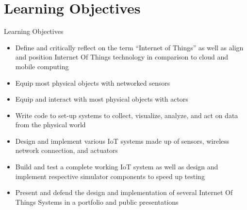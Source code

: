 ﻿\section{Learning Objectives}

\begin{frame}{Learning Objectives}
\begin{itemize}
    \item \alert{Define and critically reflect} on the term “Internet of Things” as well as align and position Internet Of Things technology in comparison to cloud and mobile computing
    \item Equip most \alert{physical objects} with \alert{networked sensors}
    \item Equip and interact with most \alert{physical objects} with \alert{actors}
    \item \alert{Write code} to set-up systems to \alert{collect}, \alert{visualize}, \alert{analyze}, and \alert{act on data from the physical world}
    \item \alert{Design} and \alert{implement various IoT} systems made up of sensors, wireless network connection, and actuators
    \item \alert{Build} and \alert{test} a complete \alert{working IoT system} as well as design and implement respective simulator components to speed up testing
    \item \alert{Present and defend} the design and implementation of several \alert{Internet Of Things Systems} in a portfolio and public presentations
\end{itemize}
\end{frame}
